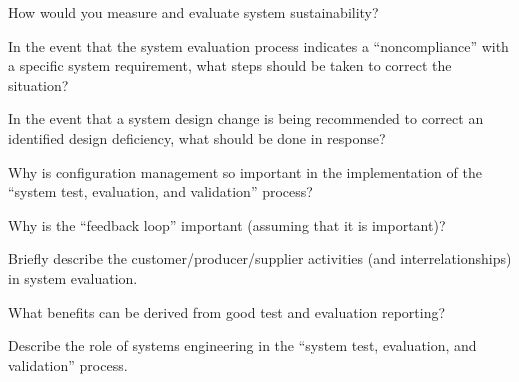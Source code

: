 \begin{exercises}
    \begin{exercise}
    \label{sea-6-13}
        How would you measure and evaluate system sustainability?
    \end{exercise}
    \begin{solution}
    \end{solution}
    
    \begin{exercise}
    \label{sea-6-14}
        In the event that the system evaluation process indicates a “noncompliance” with a specific system requirement, what steps should be taken to correct the situation?
    \end{exercise}
    \begin{solution}
    \end{solution}
    
    \begin{exercise}
    \label{sea-6-15}
        In the event that a system design change is being recommended to correct an identified design deficiency, what should be done in response?
    \end{exercise}
    \begin{solution}
    \end{solution}
    
    \begin{exercise}
    \label{sea-6-16}
        Why is configuration management so important in the implementation of the “system test, evaluation, and validation” process?
    \end{exercise}
    \begin{solution}
    \end{solution}
    
    \begin{exercise}
    \label{sea-6-17}
        Why is the “feedback loop” important (assuming that it is important)?
    \end{exercise}
    \begin{solution}
    \end{solution}
    
    \begin{exercise}
    \label{sea-6-18}
        Briefly describe the customer/producer/supplier activities (and interrelationships) in system evaluation.
    \end{exercise}
    \begin{solution}
    \end{solution}
    
    \begin{exercise}
    \label{sea-6-19}
        What benefits can be derived from good test and evaluation reporting?
    \end{exercise}
    \begin{solution}
    \end{solution}
    
    \begin{exercise}
    \label{sea-6-20}
        Describe the role of systems engineering in the “system test, evaluation, and validation” process.
    \end{exercise}
    \begin{solution}
    \end{solution}
\end{exercises}
